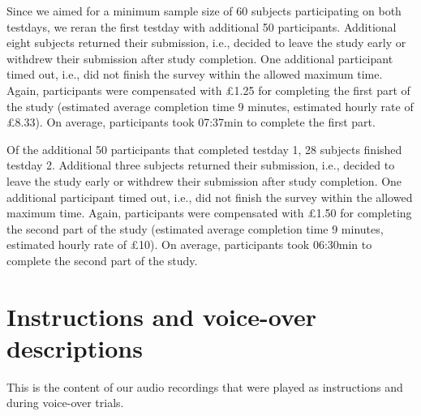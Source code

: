 \documentclass[
  man,floatsintext]{apa6}
\begin{document}
Since we aimed for a minimum sample size of 60 subjects participating on both testdays, we reran the first testday with additional 50 participants.
Additional eight subjects returned their submission, i.e., decided to leave the study early or withdrew their submission after study completion.
One additional participant timed out, i.e., did not finish the survey within the allowed maximum time.
Again, participants were compensated with £1.25 for completing the first part of the study (estimated average completion time 9 minutes, estimated hourly rate of £8.33).
On average, participants took 07:37min to complete the first part.

Of the additional 50 participants that completed testday 1, 28 subjects finished testday 2.
Additional three subjects returned their submission, i.e., decided to leave the study early or withdrew their submission after study completion.
One additional participant timed out, i.e., did not finish the survey within the allowed maximum time.
Again, participants were compensated with £1.50 for completing the second part of the study (estimated average completion time 9 minutes, estimated hourly rate of £10).
On average, participants took 06:30min to complete the second part of the study.

\newpage

\hypertarget{instructions-and-voice-over-descriptions}{%
\section{Instructions and voice-over descriptions}\label{instructions-and-voice-over-descriptions}}

This is the content of our audio recordings that were played as instructions and during voice-over trials.
\end{document}
